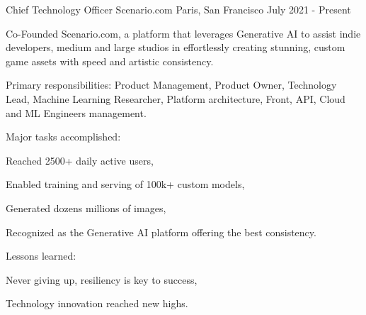 

\begin{cventries}

  \cventry
    {Chief Technology Officer} %
    {Scenario.com} %
    {Paris, San Francisco} %
    {July 2021 - Present} %
    {
      \begin{cvitems} %
        \item {Co-Founded Scenario.com, a platform that leverages Generative AI to assist indie developers, medium and large studios in effortlessly creating stunning, custom game assets with speed and artistic consistency.}
        \item {Primary responsibilities: Product Management, Product Owner, Technology Lead, Machine Learning Researcher, Platform architecture, Front, API, Cloud and ML Engineers management.}
        \item {Major tasks accomplished:}
        \begin{cvsubitems}
          \item {Reached 2500+ daily active users,}
          \item {Enabled training and serving of 100k+ custom models,}
          \item {Generated dozens millions of images,}
          \item {Recognized as the Generative AI platform offering the best consistency.}
        \end{cvsubitems}
        \item {Lessons learned:}
        \begin{cvsubitems}
          \item {Never giving up, resiliency is key to success,}
          \item {Technology innovation reached new highs.}
        \end{cvsubitems}
      \end{cvitems}
    }


\end{cventries}
